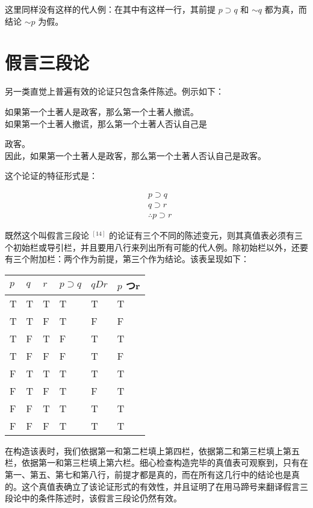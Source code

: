 这里同样没有这样的代人例：在其中有这样一行，其前提 $p \supset q$ 和 $\sim q$ 都为真，而结论 $\sim p$ 为假。

\section*{假言三段论}
另一类直觉上普遍有效的论证只包含条件陈述。例示如下：

如果第一个土著人是政客，那么第一个土著人撤谎。\\
如果第一个土著人撤谎，那么第一个土著人否认自己是

政客。\\
因此，如果第一个土著人是政客，那么第一个土著人否认自己是政客。

这个论证的特征形式是：

$$
\begin{aligned}
& p \supset q \\
& q \supset r \\
& \therefore p \supset r
\end{aligned}
$$

既然这个叫假言三段论 ${ }^{[14]}$ 的论证有三个不同的陈述变元，则其真值表必须有三个初始栏或导引栏，并且要用八行来列出所有可能的代人例。除初始栏以外，还要有三个附加栏：两个作为前提，第三个作为结论。该表呈现如下：

\begin{center}
\begin{tabular}{|l|l|l|l|l|l|}
\hline
$p$ & $q$ & $r$ & $p \supset q$ & $q D r$ & $p$ つr \\
\hline
T & T & T & T & T & T \\
\hline
T & T & F & T & F & F \\
\hline
T & F & T & F & T & T \\
\hline
T & F & F & F & T & F \\
\hline
F & T & T & T & T & T \\
\hline
F & T & F & T & F & T \\
\hline
F & F & T & T & T & T \\
\hline
F & F & F & T & T & T \\
\hline
\end{tabular}
\end{center}

在构造该表时，我们依据第一和第二栏填上第四栏，依据第二和第三栏填上第五栏，依据第一和第三栏填上第六栏。细心检查构造完毕的真值表可观察到，只有在第一、第五、第七和第八行，前提才都是真的，而在所有这几行中的结论也是真的。这个真值表确立了该论证形式的有效性，并且证明了在用马蹄号来翻译假言三段论中的条件陈述时，该假言三段论仍然有效。

